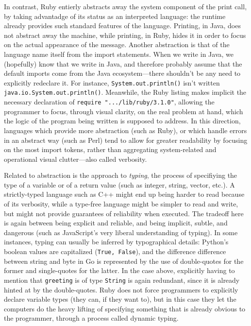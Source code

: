 In contrast, Ruby entierly abstracts away the system component of the print call, by taking advantadge of its status as an interpreted language: the runtime already provides such standard features of the language. Printing, in Java, does not abstract away the machine, while printing, in Ruby, hides it in order to focus on the actual appearance of the message. Another abstraction is that of the language name itself from the import statements. When we write in Java, we (hopefully) know that we write in Java, and therefore probably assume that the default imports come from the Java ecosystem—there shouldn't be any need to explicitly redeclare it. For instance, \lstinline{System.out.println()} isn't written \lstinline{java.io.System.out.println()}. Meanwhile, the Ruby listing makes implicit the necessary declaration of \lstinline{require ".../lib/ruby/3.1.0"}, allowing the programmer to focus, through visual clarity, on the real problem at hand, which the logic of the program being written is supposed to address. In this direction, languages which provide more abstraction (such as Ruby), or which handle errors in an abstract way (such as Perl) tend to allow for greater readability by focusing on the most import tokens, rather than aggregating system-related and operational visual clutter—also called verbosity.

Related to abstraction is the approach to \emph{typing}, the process of specifiying the type of a variable or of a return value (such as integer, string, vector, etc.). A strictly-typed language such as C++ might end up being harder to read because of its verbosity, while a type-free language might be simpler to read and write, but might not provide guarantees of reliability when executed. The tradeoff here is again between being explicit and reliable, and being implicit, subtle, and dangerous (such as JavaScript's very liberal understanding of typing). In some instances, typing can usually be inferred by typographical details: Python's boolean values are capitalized (\lstinline{True, False}), and the difference difference between string and byte in Go is represented by the use of double-quotes for the former and single-quotes for the latter. In the case above, explicitly having to mention that \lstinline{greeting} is of type \lstinline{String} is again redundant, since it is already hinted at by the double-quotes. Ruby does not force programmers to explicitly declare variable types (they can, if they want to), but in this case they let the computers do the heavy lifting of specifying something that is already obvious to the programmer, through a process called dynamic typing.

